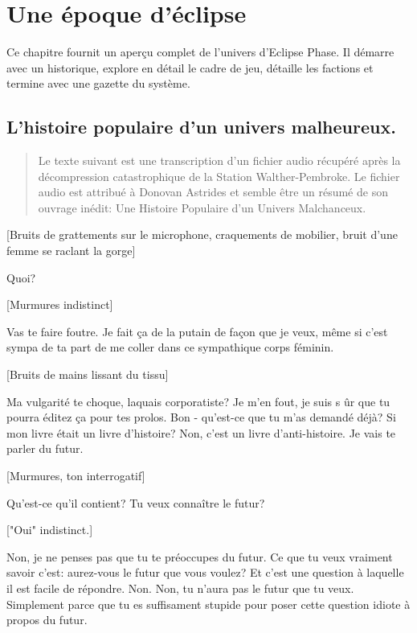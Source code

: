 \chapter{Une époque d'éclipse} \label{chap:a-time-of-eclipse} 

Ce chapitre fournit un aperçu complet de l'univers d'Eclipse Phase. Il démarre avec un historique, explore en détail le cadre de jeu, détaille les factions et termine avec une gazette du système. 

\section{L'histoire populaire d'un univers malheureux.} \label{sec:peoples-history-an} 

\begin{quotation} Le texte suivant est une transcription d'un fichier audio récupéré après la décompression catastrophique de la Station Walther-Pembroke. Le fichier audio est attribué à Donovan Astrides et semble être un résumé de son ouvrage inédit: Une Histoire Populaire d'un Univers Malchanceux. \end{quotation} 

[Bruits de grattements sur le microphone, craquements de mobilier, bruit d'une femme se raclant la gorge] 

Quoi? 

[Murmures indistinct] 

Vas te faire foutre. Je fait ça de la putain de façon que je veux, même si c'est sympa de ta part de me coller dans ce sympathique corps féminin. 

[Bruits de mains lissant du tissu] 

Ma vulgarité te choque, laquais corporatiste? Je m'en fout, je suis s ûr que tu pourra éditez ça pour tes prolos. Bon - qu'est-ce que tu m'as demandé déjà? Si mon livre était un livre d'histoire? Non, c'est un livre d'anti-histoire. Je vais te parler du futur. 

[Murmures, ton interrogatif] 

Qu'est-ce qu'il contient? Tu veux connaître le futur? 

["Oui" indistinct.] 

Non, je ne penses pas que tu te préoccupes du futur. Ce que tu veux vraiment savoir c'est: aurez-vous le futur que vous voulez? Et c'est une question à laquelle il est facile de répondre. Non. Non, tu n'aura pas le futur que tu veux. Simplement parce que tu es suffisament stupide pour poser cette question idiote à propos du futur. 

